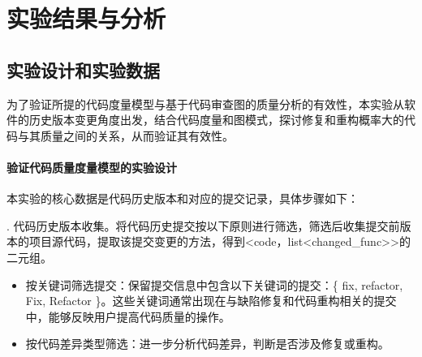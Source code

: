 



\section{实验结果与分析}

\subsection{实验设计和实验数据}

 为了验证所提的代码度量模型与基于代码审查图的质量分析的有效性，本实验从软件的历史版本变更角度出发，结合代码度量和图模式，探讨修复和重构概率大的代码与其质量之间的关系，从而验证其有效性。

\paragraph{验证代码质量度量模型的实验设计}  本实验的核心数据是代码历史版本和对应的提交记录，具体步骤如下：

. 代码历史版本收集。将代码历史提交按以下原则进行筛选，筛选后收集提交前版本的项目源代码，提取该提交变更的方法，得到<code，list<changed\_func>>的二元组。

\begin{itemize}
    \item 按关键词筛选提交：保留提交信息中包含以下关键词的提交：\{ fix, refactor, Fix, Refactor \}。这些关键词通常出现在与缺陷修复和代码重构相关的提交中，能够反映用户提高代码质量的操作。
    \item 按代码差异类型筛选：进一步分析代码差异，判断是否涉及修复或重构。
\end{itemize}

